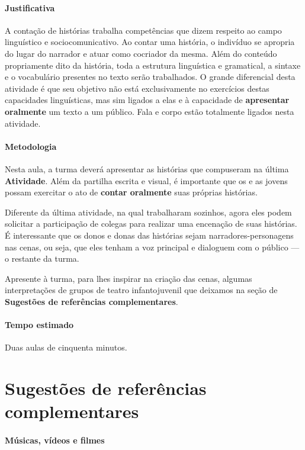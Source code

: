 \documentclass[11pt]{extarticle}
\begin{document}
\paragraph{Justificativa} A contação de histórias trabalha competências
que dizem respeito ao campo linguístico e sociocomunicativo. 
Ao contar uma história, o indivíduo se apropria do lugar do narrador e
atuar como cocriador da mesma. Além do conteúdo propriamente dito 
da história, toda a estrutura linguística e gramatical, a sintaxe 
e o vocabulário presentes no texto serão trabalhados. 
O grande diferencial desta atividade é que seu objetivo não está 
exclusivamente no exercícios destas capacidades linguísticas, 
mas sim ligados a elas e à capacidade de \textbf{apresentar oralmente}
um texto a um público. Fala e corpo estão totalmente ligados nesta atividade. 

\paragraph{Metodologia} Nesta aula, a turma deverá apresentar as histórias
que compuseram na última \textbf{Atividade}. Além da partilha escrita e visual,
é importante que os e as jovens possam exercitar o ato de \textbf{contar oralmente}
suas próprias histórias. 

Diferente da última atividade, na qual trabalharam sozinhos, agora eles podem 
solicitar a participação de colegas para realizar uma encenação de suas histórias. 
É interessante que os donos e donas das histórias sejam narradores-personagens 
nas cenas, ou seja, que eles tenham a voz principal e dialoguem com o público --- o restante da turma. 

Apresente à turma, para lhes inspirar na criação das cenas, algumas interpretações
de grupos de teatro infantojuvenil que deixamos na seção de \textbf{Sugestões de referências complementares}.


\paragraph{Tempo estimado} Duas aulas de cinquenta minutos.


\section{Sugestões de referências complementares}

\paragraph{Músicas, vídeos e filmes}
\end{document}
